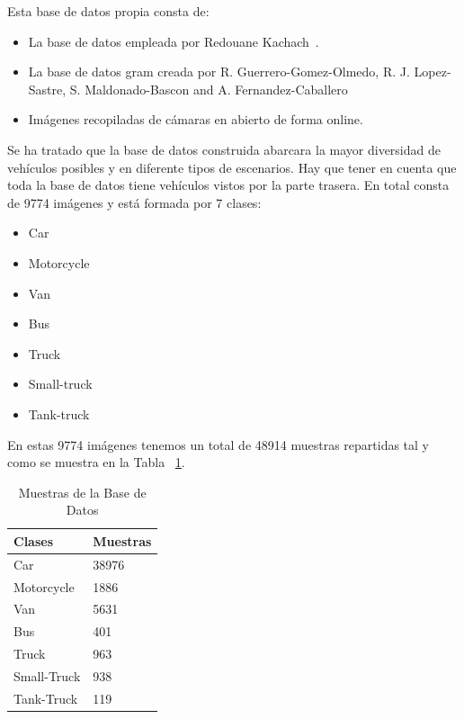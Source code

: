 Esta base de datos propia consta de:
\begin{itemize}
    \item La base de datos empleada por Redouane Kachach~\cite{traffic_monitor_lab}.
    \item La base de datos \acrfull{gram} creada por R. Guerrero-Gomez-Olmedo, R. J. Lopez-Sastre, S. Maldonado-Bascon and A. Fernandez-Caballero~\cite{guerrero2013iwinac} 
    \item Imágenes recopiladas de cámaras en abierto de forma online.
\end{itemize} 

Se ha tratado que la base de datos construida abarcara la mayor diversidad de vehículos posibles y en diferente tipos de escenarios. Hay que tener en cuenta que toda la base de datos tiene vehículos vistos por la parte trasera. En total consta de 9774 imágenes y está formada por 7 clases:
\begin{itemize}
    \item Car
    \item Motorcycle
    \item Van
    \item Bus
    \item Truck
    \item Small-truck
    \item Tank-truck
\end{itemize}

En estas 9774 imágenes tenemos un total de 48914 muestras repartidas tal y como se muestra en la Tabla ~\ref{tabla_muestras}.

\begin{table}[htbp] 
\begin{center}
\begin{tabular}{|l|l|}
\hline
Clases & Muestras \\
\hline \hline
Car & 38976 \\ \hline
Motorcycle & 1886 \\ \hline
Van & 5631 \\ \hline
Bus & 401 \\ \hline
Truck & 963 \\ \hline
Small-Truck & 938 \\ \hline
Tank-Truck & 119 \\ \hline
\end{tabular}
\caption{Muestras de la Base de Datos}
\label{tabla_muestras}
\end{center}
\end{table}

